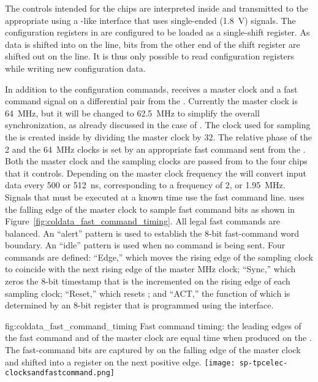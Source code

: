 The controls intended for the  chips are interpreted 
inside  and transmitted to the appropriate  using 
a -like interface that uses single-ended (\SI{1.8}{V})  
signals. The configuration registers in  are configured to be 
loaded as a single-shift register. As data is shifted into  on 
the  line, bits from the other end of the shift register are shifted 
out on the  line. It is thus only possible to read  
configuration registers while writing new configuration data.

In addition to the configuration commands,  
receives a master clock and a fast command signal on a  
differential pair from
the . Currently the master clock is \SI{64}{MHz}, but it will be
changed to \SI{62.5}{MHz} to simplify the overall   
synchronization, as already discussed in the case of . The clock 
used for sampling the  is created inside
 by dividing the master clock by \num{32}. The relative phase
of the \num{2} and the \SI{64}{MHz} clocks is set by an appropriate fast
command sent from the .  Both the master clock and
the  sampling clocks are passed from  to the four
 chips that it controls. Depending on the master clock frequency
the  will convert input data every \num{500} or \SI{512}{ns}, 
corresponding to a frequency of \num{2}, or \SI{1.95}{MHz}. Signals that must be
executed at a known time use the fast command line.  
uses the falling edge of the master clock to sample fast command bits as shown 
in Figure~\ref{fig:coldata_fast_command_timing}. All legal fast commands 
are  balanced. An ``alert'' pattern is used to establish the 8-bit 
fast-command word boundary. An ``idle'' pattern is used when no command is being 
sent. Four commands are defined: ``Edge,'' which moves the rising edge of the 
 sampling clock to coincide with the next rising edge of the 
master MHz clock; ``Sync,'' which zeros the \num{8}-bit timestamp that is the incremented 
on the rising edge of each  sampling clock; ``Reset,'' which resets 
; and ``ACT,'' the function of which is determined by an \num{8}-bit 
register that is programmed using the  interface.  

\begin{dunefigure}
{fig:coldata_fast_command_timing}
{Fast command timing: the leading edges of the fast command and of the master 
clock are equal time when produced on the . The fast-command bits 
are captured by  on the falling edge of the master clock and 
shifted into a register on the next positive edge.}
\texttt{[image: sp-tpcelec-clocksandfastcommand.png]}
\end{dunefigure}

